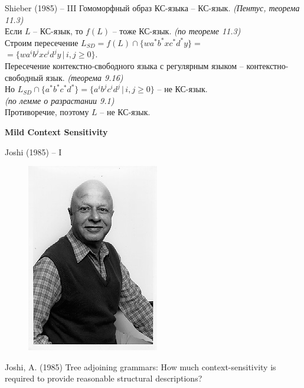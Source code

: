 \documentclass{beamer}
\begin{document}
\begin{frame}{Shieber (1985) -- III}
Гомоморфный образ КС-языка -- КС-язык. {\small \textit{(Пентус, теорема 11.3)}}\\
\bigskip
Если $L$ -- КС-язык, то $f(L)$ -- тоже КС-язык. {\small \textit{(по теореме 11.3)}}\\
\bigskip
Строим пересечение $L_{SD} = f(L) \cap \{ wa^*b^*xc^*d^*y \} =$\\ $= \{ wa^ib^jxc^id^jy \, | \, i, j \geq 0 \}$.\\
\bigskip
Пересечение контекстно-свободного языка с регулярным языком -- контекстно-свободный язык. {\small \textit{(теорема 9.16)}}\\
\bigskip
Но $L_{SD} \cap \{ a^*b^*c^*d^* \} = \{ a^ib^jc^id^j \, | \, i, j \geq 0 \}$ -- не КС-язык.\\ {\small \textit{(по лемме о разрастании 9.1)}}\\
\bigskip
Противоречие, поэтому $L$ -- не КС-язык.
\end{frame}


\begin{frame}{}
\begin{center}
	\textbf{Mild Context Sensitivity}
\end{center}
\end{frame}

\begin{frame}{Joshi (1985) -- I}
\begin{center}
	\begin{figure}[H]
		\includegraphics[scale=0.5]{joshi.jpg} 
	\end{figure}
\end{center}
\smallskip
\begin{center}
{\small Joshi, A. (1985) Tree adjoining grammars: How much context-sensitivity is required to provide reasonable structural descriptions?}
\end{center}
\end{frame}
\end{document}
